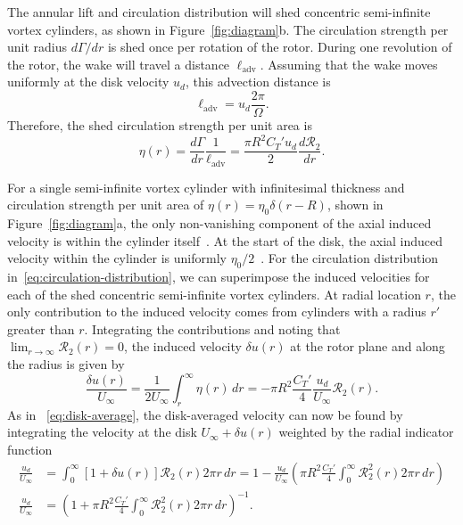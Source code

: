 \documentclass{article}
\begin{document}
The annular lift and circulation distribution will shed concentric semi-infinite vortex cylinders, as shown in Figure~\ref{fig:diagram}b. The circulation strength per unit radius $d \Gamma/dr$ is shed once per rotation of the rotor. During one revolution of the rotor, the wake will travel a distance $\ell_\text{adv}$. Assuming that the wake moves uniformly at the disk velocity $u_d$, this advection distance is
\begin{equation}
\ell_\text{adv} = u_d \frac{2\pi}{\Omega}.
\end{equation}
Therefore, the shed circulation strength per unit area is
\begin{equation}
\label{eq:circulation-distribution}
\eta(r) = \frac{d\Gamma}{dr} \frac{1}{\ell_\text{adv}} = \frac{\pi R^2 C_T' u_d }{2} \frac{d \mathcal{R}_2}{dr}.
\end{equation}

For a single semi-infinite vortex cylinder with infinitesimal thickness and circulation strength per unit area of $\eta(r) = \eta_0 \delta(r-R)$, shown in Figure~\ref{fig:diagram}a, the only non-vanishing component of the axial induced velocity is within the cylinder itself~\cite{Gibson1974a}. At the start of the disk, the axial induced velocity within the cylinder is uniformly $\eta_0/2$~\cite{Gibson1974a}. For the circulation distribution in~\eqref{eq:circulation-distribution}, we can superimpose the induced velocities for each of the shed concentric semi-infinite vortex cylinders. At radial location $r$, the only contribution to the induced velocity comes from cylinders with a radius $r'$ greater than $r$. Integrating the contributions and noting that $\lim_{r \rightarrow \infty}\mathcal{R}_2(r) = 0$, the induced velocity $\delta u(r)$ at the rotor plane and along the radius is given by
\begin{equation}
\label{eq:induced-velocity}
\frac{\delta u(r)}{U_\infty} = \frac{1}{2U_\infty}\int_r^\infty \eta(r) \, dr = - \pi R^2 \frac{C_T'}{4} \frac{u_d}{U_\infty} \mathcal{R}_2(r).
\end{equation}
As in ~\eqref{eq:disk-average}, the disk-averaged velocity can now be found by integrating the velocity at the disk $U_\infty + \delta u(r)$ weighted by the radial indicator function
\begin{align}
\label{eq:filtered-ud-start}
\frac{u_d}{U_\infty} &= \int_0^\infty \left[1+\delta u(r)\right] \mathcal{R}_2(r) 2 \pi r \, dr = 1 - \frac{u_d}{U_\infty} \left(\pi R^2 \frac{C_T'}{4} \int_0^\infty \mathcal{R}^2_2(r) 2 \pi r \, dr \right) \\
\label{eq:filtered-ud}
\frac{u_d}{U_\infty}  &= \left(1 +  \pi R^2 \frac{C_T'}{4}\int_0^\infty \mathcal{R}^2_2(r) 2 \pi r \, dr\right)^{-1}.
\end{align}
\end{document}
